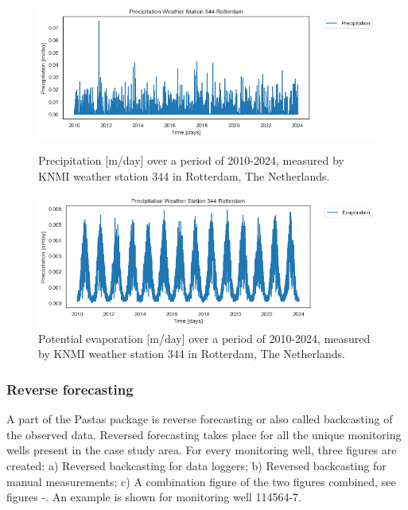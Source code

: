 \begin{figure}[htbp]
    \centering
    \begin{minipage}{0.45\textwidth}
        \centering
        \includegraphics[width=\linewidth]{frontmatter/Heijplaat-fig/P.png}
        \caption{Precipitation [m/day] over a period of 2010-2024, measured by KNMI weather station 344 in Rotterdam, The Netherlands. }
        \label{P}
    \end{minipage}\hfill
    \begin{minipage}{0.45\textwidth}
        \centering
        \includegraphics[width=\linewidth]{frontmatter/Heijplaat-fig/ET.png}
        \caption{Potential evaporation [m/day] over a period of 2010-2024, measured by KNMI weather station 344 in Rotterdam, The Netherlands.}
        \label{ET}
    \end{minipage}
\end{figure}

\subsubsection{Reverse forecasting}
A part of the Pastas package is reverse forecasting or also called backcasting of the observed data. Reversed forecasting takes place for all the unique monitoring wells present in the case study area. For every monitoring well, three figures are created: a) Reversed backcasting for data loggers; b) Reversed backcasting for manual measurements; c) A combination figure of the two figures combined, see figures -. An example is shown for monitoring well 114564-7.

